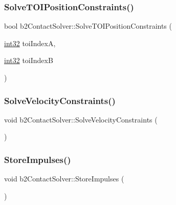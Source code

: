 \mbox{\label{classb2_contact_solver_a6604c8fc034f89ad2e3461f4b5c20844}} 
\subsubsection{\texorpdfstring{SolveTOIPositionConstraints()}{SolveTOIPositionConstraints()}}
{\footnotesize\ttfamily bool b2\+Contact\+Solver\+::\+Solve\+T\+O\+I\+Position\+Constraints (\begin{DoxyParamCaption}\item[{\mbox{\hyperlink{b2_settings_8h_a43d43196463bde49cb067f5c20ab8481}{int32}}}]{toi\+IndexA,  }\item[{\mbox{\hyperlink{b2_settings_8h_a43d43196463bde49cb067f5c20ab8481}{int32}}}]{toi\+IndexB }\end{DoxyParamCaption})}

\mbox{\label{classb2_contact_solver_abec74e1246fdbfddbd2236602da63e1f}} 
\subsubsection{\texorpdfstring{SolveVelocityConstraints()}{SolveVelocityConstraints()}}
{\footnotesize\ttfamily void b2\+Contact\+Solver\+::\+Solve\+Velocity\+Constraints (\begin{DoxyParamCaption}{ }\end{DoxyParamCaption})}

\mbox{\label{classb2_contact_solver_aff5922a65bb5ccf473c425719bb8938d}} 
\subsubsection{\texorpdfstring{StoreImpulses()}{StoreImpulses()}}
{\footnotesize\ttfamily void b2\+Contact\+Solver\+::\+Store\+Impulses (\begin{DoxyParamCaption}{ }\end{DoxyParamCaption})}

